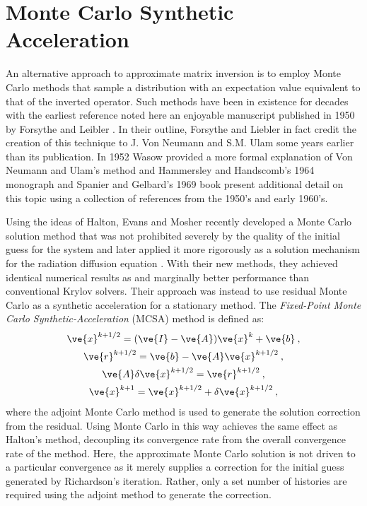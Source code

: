 \documentclass[letterpaper,12pt]{article}
\begin{document}
\section{Monte Carlo Synthetic Acceleration}

An alternative approach to approximate matrix inversion is to employ
Monte Carlo methods that sample a distribution with an expectation
value equivalent to that of the inverted operator. Such methods have
been in existence for decades with the earliest reference noted here
an enjoyable manuscript published in 1950 by Forsythe and Leibler
\cite{forsythe_matrix_1950}. In their outline, Forsythe and Liebler
in fact credit the creation of this technique to J. Von Neumann and
S.M. Ulam some years earlier than its publication. In 1952 Wasow
provided a more formal explanation of Von Neumann and Ulam's method
\cite{wasow_note_1952} and Hammersley and Handscomb's 1964 monograph
\cite{hammersley_monte_1964} and Spanier and Gelbard's 1969 book
\cite{spanier_monte_1969} present additional detail on this topic
using a collection of references from the 1950's and early 1960's.

Using the ideas of Halton, Evans and Mosher recently developed a Monte
Carlo solution method that was not prohibited severely by the quality
of the initial guess for the system \cite{evans_monte_2009} and later
applied it more rigorously as a solution mechanism for the radiation
diffusion equation \cite{evans_monte_2012}. With their new methods,
they achieved identical numerical results as and marginally better
performance than conventional Krylov solvers. Their approach was
instead to use residual Monte Carlo as a synthetic acceleration for a
stationary method. The \textit{Fixed-Point Monte Carlo
  Synthetic-Acceleration} (MCSA) method is defined as:
\begin{subequations}
  \begin{gather}
    \ve{x}^{k+1/2} = (\ve{I} - \ve{A})\ve{x}^k + \ve{b}\:,\\
    \ve{r}^{k+1/2} = \ve{b} - \ve{A}\ve{x}^{k+1/2}\:,\\
    \ve{A}\delta\ve{x}^{k+1/2} = \ve{r}^{k+1/2}\:,\\
    \ve{x}^{k+1} = \ve{x}^{k+1/2} + \delta \ve{x}^{k+1/2}\:,
  \end{gather}
  \label{eq:mcsa}
\end{subequations}
where the adjoint Monte Carlo method is used to generate the solution
correction from the residual. Using Monte Carlo in this way achieves
the same effect as Halton's method, decoupling its convergence rate
from the overall convergence rate of the method. Here, the approximate
Monte Carlo solution is not driven to a particular convergence as it
merely supplies a correction for the initial guess generated by
Richardson's iteration. Rather, only a set number of histories are
required using the adjoint method to generate the correction.
\end{document}
